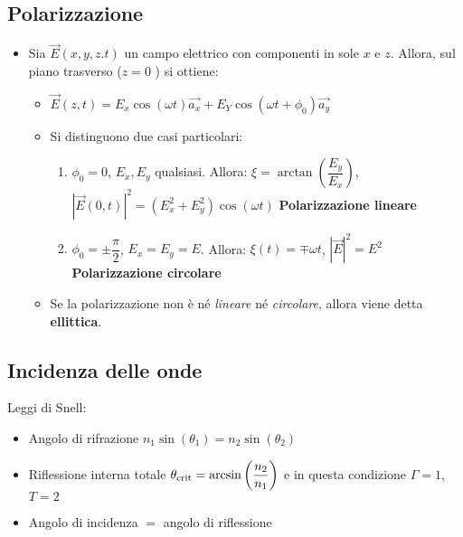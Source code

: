 \documentclass{article}
\begin{document}
\subsection{Polarizzazione}
\begin{itemize}
	\item Sia \( \vec{E}(x, y, z. t) \) un campo elettrico con componenti in sole \( x \) e \( z \). Allora, sul piano trasverso (\( z = 0\) ) si ottiene:
	\begin{itemize}
		\item \( \vec{E}(z, t) = E_x \cos ( \omega t) \vec{a_x} + E_Y \cos( \omega t + \phi_0) \vec{a_y}  \)
		\item Si distinguono due casi particolari:
		\begin{enumerate}
			\item \( \phi_0 = 0 \), \( E_x, E_y \) qualsiasi. Allora: \( \xi  = \arctan\left(\dfrac{E_y}{E_x}\right) \), \( |\vec{E}(0, t)|^2 = (E_x^2 + E_y^2) \cos(\omega t) \) \textbf{Polarizzazione lineare}
			\item  \( \phi_0 = \pm \dfrac{\pi}{2} \), \( E_x = E_y = E \). Allora: \( \xi(t)  = \mp \omega t \), \( |\vec{E}|^2 = E^2 \) \textbf{Polarizzazione circolare}
		\end{enumerate}
		\item Se la polarizzazione non è né \textit{lineare} né \textit{circolare}, allora viene detta \textbf{ellittica}.
	\end{itemize}	  
\end{itemize}

\subsection{Incidenza delle onde}
Leggi di Snell:
\begin{itemize}
	\item Angolo di rifrazione \(n_1 \sin(\theta_1) = n_2 \sin(\theta_2) \)
	\item Riflessione interna totale \(\theta_{\textnormal{crit}} = \arcsin\left( \dfrac{n_2}{n_1} \right) \) e in questa condizione \(\Gamma = 1\), \(T = 2\)
	\item Angolo di incidenza \(=\) angolo di riflessione
\end{itemize}
\end{document}
